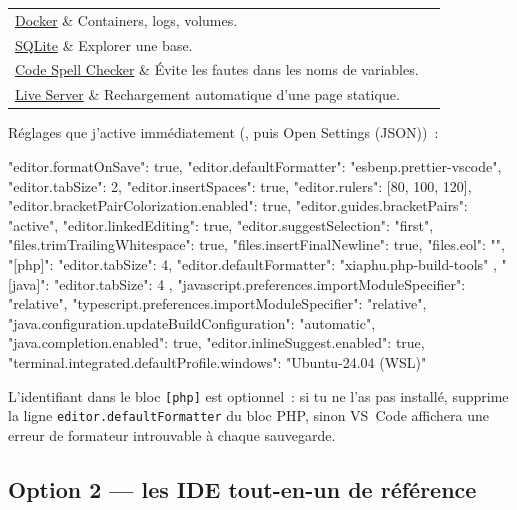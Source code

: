 \documentclass[12pt,a4paper,twoside,openright]{book}
\makeatletter
\providecommand{\cmd}[1]{}%
\renewcommand{\cmd}[1]{\srcbox{\texttt{\detokenize{#1}}}}
\newcommand{\link}[2]{\href{#2}{#1}}
\DeclareRobustCommand{\clic}[1]{\textcolor{linkblue}{\textsf{#1}}}
\newenvironment{tabz}[1]{\rowcolors{2}{white}{tralight}%
  \small\setlength{\tabcolsep}{5pt}\setlength{\LTpre}{3pt}\setlength{\LTpost}{3pt}%
  \begin{longtable}{@{}#1@{}}\toprule}
  {\bottomrule\end{longtable}\normalfont\setlength{\tabcolsep}{6pt}}
\makeatother
\begin{document}
\begin{tabz}{Xl}
  \link{Docker}{https://marketplace.visualstudio.com/items?itemName=ms-azuretools.vscode-docker} \& Containers, logs, volumes.\\
  \link{SQLite}{https://marketplace.visualstudio.com/items?itemName=qwtel.sqlite-viewer} \& Explorer une base.\\
  \link{Code Spell Checker}{https://marketplace.visualstudio.com/items?itemName=streetsidesoftware.code-spell-checker} \& \'Evite les fautes dans les noms de variables.\\
  \link{Live Server}{https://marketplace.visualstudio.com/items?itemName=ritwickdey.LiveServer} \& Rechargement automatique d'une page statique.\\
\end{tabz}

R\'eglages que j'active imm\'ediatement (, puis \clic{Open Settings (JSON)})~:

\begin{codejson}
{
  "editor.formatOnSave": true,
  "editor.defaultFormatter": "esbenp.prettier-vscode",
  "editor.tabSize": 2,
  "editor.insertSpaces": true,
  "editor.rulers": [80, 100, 120],
  "editor.bracketPairColorization.enabled": true,
  "editor.guides.bracketPairs": "active",
  "editor.linkedEditing": true,
  "editor.suggestSelection": "first",
  "files.trimTrailingWhitespace": true,
  "files.insertFinalNewline": true,
  "files.eol": "\n",
  "[php]": { "editor.tabSize": 4, "editor.defaultFormatter": "xiaphu.php-build-tools" },
  "[java]": { "editor.tabSize": 4 },
  "javascript.preferences.importModuleSpecifier": "relative",
  "typescript.preferences.importModuleSpecifier": "relative",
  "java.configuration.updateBuildConfiguration": "automatic",
  "java.completion.enabled": true,
  "editor.inlineSuggest.enabled": true,
  "terminal.integrated.defaultProfile.windows": "Ubuntu-24.04 (WSL)"
}
\end{codejson}

\begin{note}
L'identifiant \cmd{xiaphu.php-build-tools} dans le bloc \verb|[php]| est optionnel~:
si tu ne l'as pas install\'e, supprime la ligne \verb|editor.defaultFormatter| du bloc PHP,
sinon VS~Code affichera une erreur de formateur introuvable \`a chaque sauvegarde.
\end{note}

\subsection{Option 2 --- les IDE \og  tout-en-un  \fg{} de r\'ef\'erence}
\end{document}
